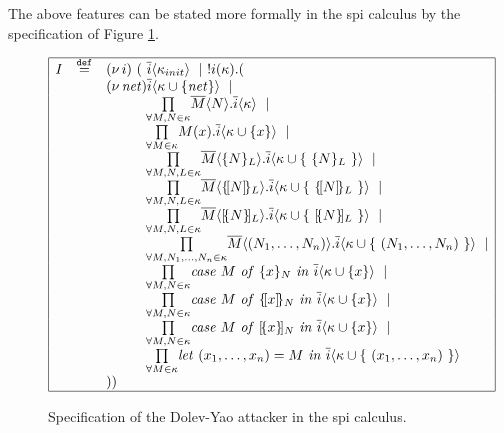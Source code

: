 \documentclass[10pt,a4paper,final,oneside,fleqn]{book}
\newcommand*{\eqdef}{\mathbin{\mathop{=}\limits^{\texttt{def}}}}
\begin{document}
The above features can be stated more formally in the spi calculus by the specification of Figure \ref{dy}.
\begin{figure}[bht]
\begin{center}
$\begin{array}{|lll|}\hline
I&\eqdef&(\nu~\!i)~(~\overline{i}\langle\kappa_{init}\rangle~\mid~!i(\kappa).(\\
&&(\nu~\!\mbox{{\itshape net\/}})\overline{i}\langle\kappa\cup\{\mbox{{\itshape net\/}}\}\rangle~\mid\\
&&\hspace{10mm}\underset{\forall M,N\in \kappa}\prod\overline{M}\langle N\rangle.\overline{i}\langle\kappa\rangle~\mid\\
&&\hspace{10mm}\underset{\forall M\in \kappa}\prod M(x).\overline{i}\langle \kappa\cup\{x\}\rangle~\mid\\
&&\hspace{10mm}\underset{\forall M,N,L\in \kappa}\prod\overline{M}\langle\{N\}_L\rangle.\overline{i}\langle\kappa\cup\{~\{N\}_L~\}\rangle~\mid\\
&&\hspace{10mm}\underset{\forall M,N,L\in \kappa}\prod\overline{M}\langle\{\![N]\!\}_{L}\rangle.\overline{i}\langle \kappa\cup\{~\{\![N]\!\}_{L}~\}\rangle~\mid\\
&&\hspace{10mm}\underset{\forall M,N,L\in \kappa}\prod\overline{M}\langle[\!\{N\}\!]_{L}\rangle.\overline{i}\langle \kappa\cup\{~[\!\{N\}\!]_{L}~\}\rangle~\mid\\
&&\hspace{10mm}\underset{\forall M,N_1,\ldots,N_n\in \kappa}\prod\overline{M}\langle(N_1,\ldots,N_n)\rangle.\overline{i}\langle\kappa\cup\{~(N_1,\ldots,N_n)~\}\rangle~\mid\\
&&\hspace{10mm}\underset{\forall M,N\in \kappa}\prod\mbox{{\itshape case\/} }M\mbox{ {\itshape of\/} }\{x\}_{N}\mbox{ {\itshape in\/} }\overline{i}\langle\kappa\cup\{x\}\rangle~\mid\\
&&\hspace{10mm}\underset{\forall M,N\in \kappa}\prod\mbox{{\itshape case\/} }M\mbox{ {\itshape of\/} }\{\![x]\!\}_{N}\mbox{ {\itshape in\/} }\overline{i}\langle\kappa\cup\{x\}\rangle~\mid\\
&&\hspace{10mm}\underset{\forall M,N\in \kappa}\prod\mbox{{\itshape case\/} }M\mbox{ {\itshape of\/} }[\!\{x\}\!]_{N}\mbox{ {\itshape in\/} }\overline{i}\langle\kappa\cup\{x\}\rangle~\mid\\
&&\hspace{10mm}\underset{\forall M\in \kappa}\prod\mbox{{\itshape let\/} }(x_1,\ldots,x_n)=M\mbox{ {\itshape in\/} }\overline{i}\langle\kappa\cup\{~(x_1,\ldots,x_n)~\}\rangle\\
&&))\\
\hline\end{array}$\end{center}
\caption{Specification of the Dolev-Yao attacker in the spi calculus.\label{dy}}
\end{figure}
\end{document}
